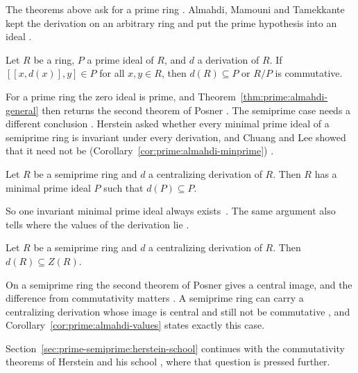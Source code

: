 The theorems above ask for a prime ring
\cite[p.~1093]{Posner1957}. Almahdi, Mamouni and Tamekkante kept the
derivation on an arbitrary ring and put the prime hypothesis into an ideal
\cite[p.~188]{AlmahdiMamouniTamekkante2020}.

\begin{theorem}\label{thm:prime:almahdi-general}
Let $R$ be a ring, $P$ a prime ideal of $R$, and $d$ a derivation of $R$. If
$[[x,d(x)],y]\in P$ for all $x,y\in R$, then $d(R)\subseteq P$ or $R/P$ is
commutative.
\end{theorem}

For a prime ring the zero ideal is prime, and
Theorem~\ref{thm:prime:almahdi-general} then returns the second theorem of
Posner \cite[p.~191]{AlmahdiMamouniTamekkante2020}. The semiprime case needs a
different conclusion \cite[p.~192]{AlmahdiMamouniTamekkante2020}. Herstein asked
whether every minimal prime ideal of a semiprime ring is invariant under every
derivation, and Chuang and Lee showed that it need not be (Corollary~\ref{cor:prime:almahdi-minprime})
\cite[p.~192]{AlmahdiMamouniTamekkante2020}.\begin{corollary}\label{cor:prime:almahdi-minprime}
Let $R$ be a semiprime ring and $d$ a centralizing derivation of $R$. Then $R$
has a minimal prime ideal $P$ such that $d(P)\subseteq P$.
\end{corollary}

So one invariant minimal prime ideal always exists~\cite[p.~192]{AlmahdiMamouniTamekkante2020}. The same argument also
tells where the values of the derivation lie
\cite[p.~192]{AlmahdiMamouniTamekkante2020}.

\begin{corollary}\label{cor:prime:almahdi-values}
Let $R$ be a semiprime ring and $d$ a centralizing derivation of $R$. Then
$d(R)\subseteq Z(R)$.
\end{corollary}

On a semiprime ring the second theorem of Posner gives a central image, and
the difference from commutativity matters
\cite[p.~192]{AlmahdiMamouniTamekkante2020}. A semiprime ring can carry a
centralizing derivation whose image is central and still not be commutative
\cite[p.~192]{AlmahdiMamouniTamekkante2020}, and
Corollary~\ref{cor:prime:almahdi-values} states exactly this case.

Section~\ref{sec:prime-semiprime:herstein-school} continues with the
commutativity theorems of Herstein and his school
\cite[p.~192]{AlmahdiMamouniTamekkante2020}, where that question is pressed
further.

